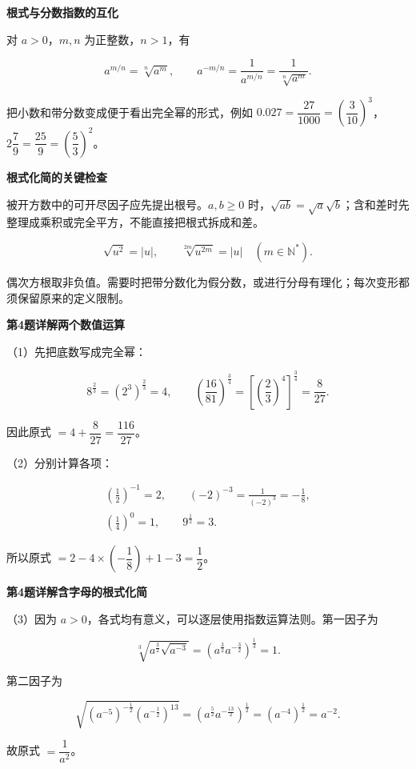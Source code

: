 \documentclass[UTF8,10pt,aspectratio=169]{ctexbeamer}
\newcommand{\PageHeading}[1]{\begin{center}{\Large\bfseries #1}\end{center}\vspace{0.12cm}}
\begin{document}
\begin{frame}[t]
\PageHeading{根式与分数指数的互化}
对 $a>0$，$m,n$ 为正整数，$n>1$，有
\par
\pause
\[a^{m/n}=\sqrt[n]{a^m},\qquad a^{-m/n}=\frac1{a^{m/n}}=\frac1{\sqrt[n]{a^m}}.\]
\par
把小数和带分数变成便于看出完全幂的形式，例如 $0.027=\dfrac{27}{1000}=(\dfrac3{10})^3$，$2\dfrac79=\dfrac{25}9=(\dfrac53)^2$。
\par
\end{frame}
\begin{frame}[t]
\PageHeading{根式化简的关键检查}
被开方数中的可开尽因子应先提出根号。$a,b\ge0$ 时，$\sqrt{ab}=\sqrt a\sqrt b$；含和差时先整理成乘积或完全平方，不能直接把根式拆成和差。
\par
\pause
\[\sqrt{u^2}=|u|,\qquad \sqrt[2m]{u^{2m}}=|u|\quad(m\in\mathbb N^*).\]
\par
偶次方根取非负值。需要时把带分数化为假分数，或进行分母有理化；每次变形都须保留原来的定义限制。
\par
\end{frame}
\begin{frame}[t]
\PageHeading{第4题详解\quad 两个数值运算}
（1）先把底数写成完全幂：
\par
\pause
\[8^{\frac23}=(2^3)^{\frac23}=4,\qquad \left(\frac{16}{81}\right)^{\frac34}=\left[\left(\frac23\right)^4\right]^{\frac34}=\frac8{27}.\]
\par
因此原式 $=4+\dfrac8{27}=\boxed{\dfrac{116}{27}}$。
\par
（2）分别计算各项：
\par
\[\begin{gathered}\left(\frac12\right)^{-1}=2,\qquad(-2)^{-3}=\frac1{(-2)^3}=-\frac18,\\\left(\frac14\right)^0=1,\qquad9^{\frac12}=3.\end{gathered}\]
\par
所以原式 $=2-4\times\left(-\dfrac18\right)+1-3=\boxed{\dfrac12}$。
\par
\end{frame}
\begin{frame}[t]
\PageHeading{第4题详解\quad 含字母的根式化简}
（3）因为 $a>0$，各式均有意义，可以逐层使用指数运算法则。第一因子为
\par
\pause
\[\sqrt[3]{a^{\frac32}\sqrt{a^{-3}}}=\left(a^{\frac32}a^{-\frac32}\right)^{\frac13}=1.\]
\par
第二因子为
\par
\[\sqrt{(a^{-5})^{-\frac12}(a^{-\frac12})^{13}}=\left(a^{\frac52}a^{-\frac{13}2}\right)^{\frac12}=(a^{-4})^{\frac12}=a^{-2}.\]
\par
故原式 $=\boxed{\dfrac1{a^2}}$。
\par
\end{frame}
\end{document}
